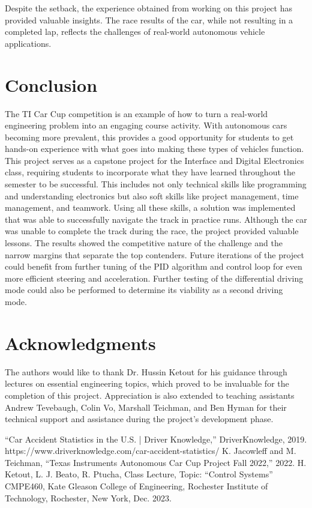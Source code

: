 \documentclass[conference]{IEEEtran}
\begin{document}
Despite the setback, the experience obtained from working on this project has provided valuable insights. The race results of the car, while not resulting in a completed lap, reflects the challenges of real-world autonomous vehicle applications.

\section{Conclusion}

The TI Car Cup competition is an example of how to turn a real-world engineering problem into an engaging course activity. With autonomous cars becoming more prevalent, this provides a good opportunity for students to get hands-on experience with what goes into making these types of vehicles function. This project serves as a capstone project for the Interface and Digital Electronics class, requiring students to incorporate what they have learned throughout the semester to be successful. This includes not only technical skills like programming and understanding electronics but also soft skills like project management, time management, and teamwork. Using all these skills, a solution was implemented that was able to successfully navigate the track in practice runs. Although the car was unable to complete the track during the race, the project provided valuable lessons. The results showed the competitive nature of the challenge and the narrow margins that separate the top contenders. Future iterations of the project could benefit from further tuning of the PID algorithm and control loop for even more efficient steering and acceleration. Further testing of the differential driving mode could also be performed to determine its viability as a second driving mode.

\section{Acknowledgments}

The authors would like to thank Dr. Hussin Ketout for his guidance through lectures on essential engineering topics, which proved to be invaluable for the completion of this project. Appreciation is also extended to teaching assistants Andrew Tevebaugh, Colin Vo, Marshall Teichman, and Ben Hyman for their technical support and assistance during the project's development phase.

\begin{thebibliography}{00}
 “Car Accident Statistics in the U.S. | Driver Knowledge,” DriverKnowledge, 2019. https://www.driverknowledge.com/car-accident-statistics/
 K. Jacowleff and M. Teichman, “Texas Instruments Autonomous Car Cup Project Fall 2022,” 2022.
 H. Ketout, L. J. Beato, R. Ptucha, Class Lecture, Topic: “Control Systems” CMPE460, Kate Gleason College of Engineering, Rochester Institute of Technology, Rochester, New York, Dec. 2023.
\end{thebibliography}
\end{document}
